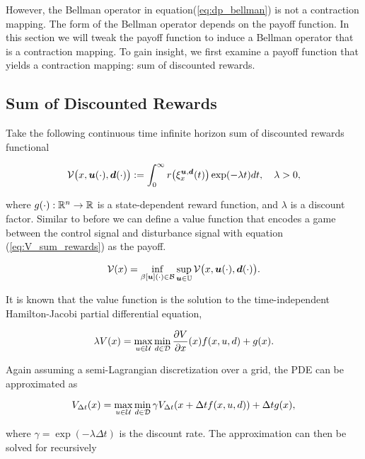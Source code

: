 \documentclass[letterpaper, 10 pt, conference]{ieeeconf}
\begin{document}
However, the Bellman operator in equation(\ref{eq:dp_bellman}) is not a contraction mapping. The form of the Bellman operator depends on the payoff function. In this section we will tweak the payoff function to induce a Bellman operator that is a contraction mapping. To gain insight, we first examine a payoff function that yields a contraction mapping: sum of discounted rewards.

\subsection{Sum of Discounted Rewards}

Take the following continuous time infinite horizon sum of discounted rewards functional

\begin{equation}\label{eq:V_sum_rewards}
\mathcal{V}\big(x,\bm{u}(\cdot),\bm{d}(\cdot)\big) := \int_{0}^{\infty}r\big(\xi_{x}^{\bm{u},\bm{d}}(t)\big)\exp(-\lambda t) dt,  \quad \lambda >0,
\end{equation}

\noindent where $g(\cdot):\mathbb{R}^n \rightarrow \mathbb{R}$ is a state-dependent reward function, and $\lambda$ is a discount factor. Similar to before we can define a value function that encodes a game between the control signal and disturbance signal with equation (\ref{eq:V_sum_rewards}) as the payoff.

\begin{equation}
\mathcal{V}(x)=\inf_{\beta[\bm{u}](\cdot) \in \mathcal{B}} \sup_{\bm{u} \in \mathbb{U}}\mathcal{V}\big(x,\bm{u}(\cdot),\bm{d}(\cdot)\big).
\end{equation}

It is known that the value function is the solution to the time-independent Hamilton-Jacobi partial differential equation,

\begin{equation}
\lambda V(x) = \max_{u\in\mathcal{U}} \min_{ d\in\mathcal{D}} \frac{\partial V}{\partial x}(x) f(x, u, d)+ g(x).
\end{equation}

Again assuming a semi-Lagrangian discretization over a grid, the PDE can be approximated as

\begin{equation}
V_{\Delta t}(x) = \max_{u\in\mathcal{U}} \min_{ d\in\mathcal{D}} \gamma V_{\Delta t}(x + \Delta t f(x, u, d))  + \Delta t g(x),
\end{equation}
 
\noindent where $\gamma=\exp(-\lambda \Delta t)$ is the discount rate. The approximation can then be solved for recursively
\end{document}
